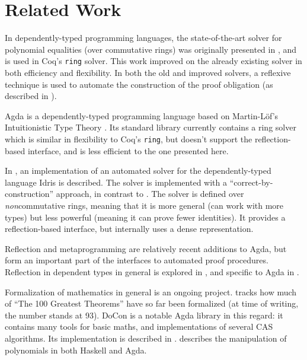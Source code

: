 \documentclass[acmsmall,review,anonymous]{acmart}\settopmatter{printfolios=true,printccs=false,printacmref=false}
\begin{document}
\section{Related Work}
In dependently-typed programming languages, the state-of-the-art solver for
polynomial equalities (over commutative rings) was originally presented
in \citet{gregoire_proving_2005}, and is used in Coq's \verb+ring+ solver. This
work improved on the already existing solver \cite{Coq:manual} in both efficiency
and flexibility. In both the old and improved solvers, a reflexive technique is
used to automate the construction of the proof obligation (as described in
\citet{boutin_using_1997}).

Agda \cite{norell_dependently_2008} is a dependently-typed programming language
based on Martin-Löf's Intuitionistic Type
Theory \cite{martin-lof_intuitionistic_1980}. Its standard
library \cite{danielsson_agda_2018} currently contains a ring solver which is
similar in flexibility to Coq's \verb+ring+, but doesn't support the
reflection-based interface, and is less efficient to the one presented here. 

In \citet{geuvers_automatically_2017}, an implementation of an automated solver
for the dependently-typed language Idris \cite{brady_idris_2013} is described.
The solver is implemented with a ``correct-by-construction'' approach, in
contrast to \citet{gregoire_proving_2005}. The solver is defined over
\emph{non}commutative rings, meaning that it is more general (can work with more
types) but less powerful (meaning it can prove fewer identities). It provides a
reflection-based interface, but internally uses a dense representation.

Reflection and metaprogramming are relatively recent additions to Agda, but form
an important part of the interfaces to automated proof procedures. Reflection in
dependent types in general is explored in \citet{christiansen_practical_2015},
and specific to Agda in \citet{van_der_walt_reflection_2012}.

Formalization of mathematics in general is an ongoing project.
\citet{wiedijk_formalizing_2018} tracks how much of ``The 100 Greatest Theorems''
\cite{kahl_hundred_2004} have so far been formalized (at time of writing, the
number stands at 93). DoCon \cite{meshveliani_docon-provable_2018} is a notable
Agda library in this regard: it contains many tools for basic maths, and
implementations of several CAS algorithms. Its implementation is described
in \citet{meshveliani_dependent_2013}. \citet{cheng_functional_2018} describes the
manipulation of polynomials in both Haskell and Agda.
\end{document}
